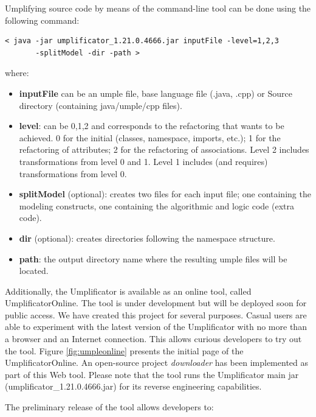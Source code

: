 Umplifying source code by means of the command-line tool can be done using the following command:

\vspace{\baselineskip}
\begin{lstlisting}[style=umplePlain]
< java -jar umplificator_1.21.0.4666.jar inputFile -level=1,2,3 
       -splitModel -dir -path >
\end{lstlisting}

where:
\begin{itemize}
\item \textbf{inputFile} can be an umple file, base language file (.java, .cpp) or Source directory (containing java/umple/cpp files).
\item \textbf{level}: can be 0,1,2 and corresponds to the refactoring that wants to be achieved. 0 for the initial (classes, namespace, imports, etc.); 1 for the refactoring of attributes; 2 for the refactoring of associations. Level 2 includes transformations from level 0 and 1. Level 1 includes (and requires) transformations from level 0.
\item \textbf{splitModel} (optional): creates two files for each input file; one containing the modeling constructs, one containing the algorithmic and logic code (extra code). 
\item \textbf{dir} (optional): creates directories following the namespace structure.
\item \textbf{path}: the output directory name where the resulting umple files will be located.
\end{itemize}

Additionally, the Umplificator is available as an online tool, called UmplificatorOnline. The tool is under development but will be deployed soon for public access. We have created this project for several purposes. Casual users are able to experiment with the latest version of the Umplificator with no more than a browser and an Internet connection. This allows curious developers to try out the tool. Figure \ref{fig:umpleonline} presents the initial page of the UmplificatorOnline.
An open-source project \textit{downloader} has been implemented as part of this Web tool. Please note that the tool runs the  Umplificator main jar (umplificator\_1.21.0.4666.jar) for its reverse engineering capabilities. 

The preliminary release of the tool allows developers to:

